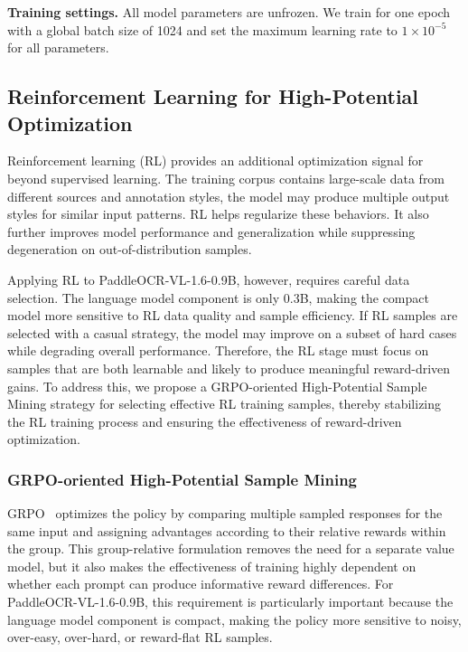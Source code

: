 \documentclass[11pt, a4paper,logo,  copyright, nonumbering]{paddleocr}
\begin{document}
\textbf{Training settings.} All model parameters are unfrozen. We train for one epoch with a global batch size of 1024 and set the maximum learning rate to $1\times10^{-5}$ for all parameters. 

\subsection{Reinforcement Learning for High-Potential Optimization}
\label{training_strategy_rl}

Reinforcement learning (RL) provides an additional optimization signal for beyond supervised learning. The training corpus contains large-scale data from different sources and annotation styles, the model may produce multiple output styles for similar input patterns. RL helps regularize these behaviors. It also further improves model performance and generalization while suppressing degeneration on out-of-distribution samples.

Applying RL to PaddleOCR-VL-1.6-0.9B, however, requires careful data selection. The language model component is only 0.3B, making the compact model more sensitive to RL data quality and sample efficiency. If RL samples are selected with a casual strategy, the model may improve on a subset of hard cases while degrading overall performance. Therefore, the RL stage must focus on samples that are both learnable and likely to produce meaningful reward-driven gains. To address this, we propose a GRPO-oriented High-Potential Sample Mining strategy for selecting effective RL training samples, thereby stabilizing the RL training process and ensuring the effectiveness of reward-driven optimization.

\subsubsection{GRPO-oriented High-Potential Sample Mining}

GRPO~\cite{shao2024deepseekmath} optimizes the policy by comparing multiple sampled responses for the same input and assigning advantages according to their relative rewards within the group. This group-relative formulation removes the need for a separate value model, but it also makes the effectiveness of training highly dependent on whether each prompt can produce informative reward differences. For PaddleOCR-VL-1.6-0.9B, this requirement is particularly important because the language model component is compact, making the policy more sensitive to noisy, over-easy, over-hard, or reward-flat RL samples.
\end{document}
